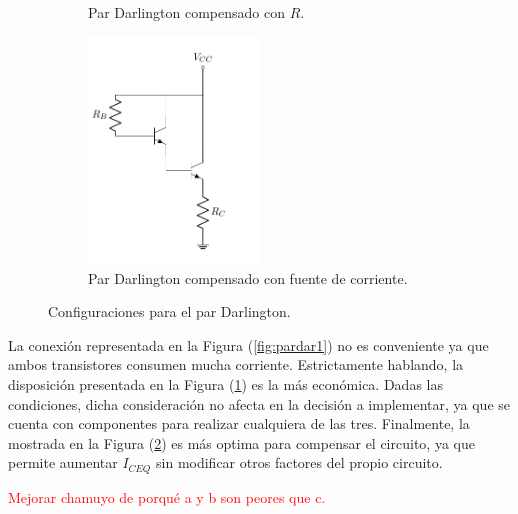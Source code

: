 \begin{figure}[H]
\begin{subfigure}{.4\textwidth}
	\caption{Par Darlington compensado con $R$.}
	\label{fig:pardar2}
\end{subfigure}
\begin{subfigure}{.5\textwidth}
\centering
	\includegraphics[width=0.5\textwidth, page=3]{Imagenes/ParDarlington.pdf}
	\caption{Par Darlington compensado con fuente de corriente.}
	\label{fig:pardar3}
\end{subfigure}
\caption{Configuraciones para el par Darlington.}
\label{fig:pardar}
\end{figure}

La conexión representada en la Figura (\ref{fig:pardar1}) no es conveniente ya que ambos transistores consumen mucha corriente. Estrictamente hablando, la disposición presentada en la Figura (\ref{fig:pardar2}) es la más económica. Dadas las condiciones, dicha consideración no afecta en la decisión a implementar, ya que se cuenta con componentes para realizar cualquiera de las tres. Finalmente, la mostrada en la Figura (\ref{fig:pardar3}) es más optima para compensar el circuito, ya que permite aumentar $I_{CEQ}$ sin modificar otros factores del propio circuito.
\begin{center}
	\Huge{\textcolor{red}{Mejorar chamuyo de porqué a y b son peores que c.}}
\end{center}

